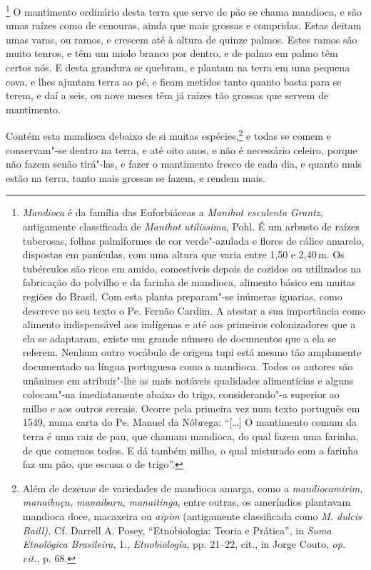 \footnote{ \textit{Mandioca} é da família das
Euforbiáceas a \textit{Manihot esculenta Grantz}, antigamente
classificada de \textit{Manihot utilissima}, Pohl. É um arbusto de
raízes tuberosas, folhas palmiformes de cor verde"-azulada e flores de
cálice amarelo, dispostas em panículas, com uma altura que varia entre
1,50 e 2,40\,m. Os tubérculos são ricos em amido, comestíveis depois de
cozidos ou utilizados na fabricação do polvilho e da farinha de
mandioca, alimento básico em muitas regiões do Brasil. Com esta planta
preparam"-se inúmeras iguarias, como descreve no seu texto o Pe. Fernão
Cardim. A atestar a sua importância como alimento indispensável aos
indígenas e até aos primeiros colonizadores que a ela se adaptaram,
existe um grande número de documentos que a ela se referem. Nenhum 
outro vocábulo de origem tupi está mesmo tão amplamente documentado na
língua portuguesa como a mandioca. Todos os autores são unânimes em
atribuir"-lhe as mais notáveis qualidades alimentícias e alguns 
colocam"-na imediatamente abaixo do trigo, considerando"-a superior ao
milho e aos outros cereais. Ocorre pela primeira vez num texto
português em 1549, numa carta do Pe. Manuel da Nóbrega: ``[\ldots] 
O mantimento comum da terra é uma raiz de pau, que chamam
mandioca, do qual fazem uma farinha, de que comemos todos. E dá também
milho, o qual misturado com a farinha faz um pão, que escusa o de
trigo''.} O mantimento ordinário desta terra que serve de
pão se chama mandioca, e são umas raízes como de cenouras, ainda que
mais grossas e compridas. Estas deitam umas varas, ou ramos, e crescem
até à altura de quinze palmos. Estes ramos são muito tenros, e têm um
miolo branco por dentro, e de palmo em palmo têm certos nós. E desta
grandura se quebram, e plantam na terra em uma pequena cova, e lhes
ajuntam terra ao pé, e ficam metidos tanto quanto basta para se terem,
e daí a seis, ou nove meses têm já raízes tão grossas que servem de mantimento.

 Contém esta mandioca debaixo de si muitas espécies,\footnote{ Além de
dezenas de variedades de mandioca amarga, como a
\textit{mandiocamirim}, \textit{manaibuçu, manaibaru, manaitinga}, 
entre outras, os ameríndios plantavam mandioca doce, macaxeira ou
\textit{aipim} (antigamente classificada como \textit{M. dulcis Baill).} 
Cf. Darrell A. Posey, ``Etnobiologia: Teoria e Prática'', in
\textit{Suma Etnológica Brasileira}, 1., \textit{Etnobiologia}, 
pp. 21--22, cit., in Jorge Couto, \textit{op. cit.}, p. 68.} e todas se comem
e conservam"-se dentro na terra, e até oito anos, e não é necessário
celeiro, porque não fazem senão tirá"-las, e fazer o mantimento fresco
de cada dia, e quanto mais estão na terra, tanto mais grossas se fazem,
e rendem mais.

